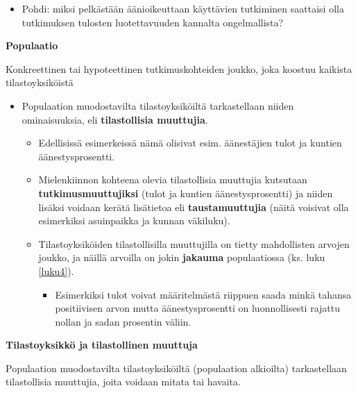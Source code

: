 \documentclass[
]{book}
\providecommand{\tightlist}{%
  \setlength{\itemsep}{0pt}\setlength{\parskip}{0pt}}
\begin{document}
\begin{itemize}
\tightlist
\item
  Pohdi: miksi pelkästään äänioikeuttaan käyttävien tutkiminen saattaisi olla tutkimuksen tulosten luotettavuuden kannalta ongelmallista?
\end{itemize}

\begin{defblock}{}
\textbf{Populaatio}

Konkreettinen tai hypoteettinen tutkimuskohteiden joukko, joka koostuu kaikista tilastoyksiköistä

\end{defblock}

\begin{itemize}
\tightlist
\item
  Populaation muodostavilta tilastoyksiköiltä tarkastellaan niiden ominaisuuksia, eli \textbf{tilastollisia muuttujia}.

  \begin{itemize}
  \tightlist
  \item
    Edellisissä esimerkeissä nämä olisivat esim. äänestäjien tulot ja kuntien äänestysprosentti.
  \item
    Mielenkiinnon kohteena olevia tilastollisia muuttujia kutsutaan \textbf{tutkimusmuuttujiksi} (tulot ja kuntien äänestysprosentti) ja niiden lisäksi voidaan kerätä lisätietoa eli \textbf{taustamuuttujia} (näitä voisivat olla esimerkiksi asuinpaikka ja kunnan väkiluku).
  \item
    Tilastoyksiköiden tilastollisilla muuttujilla on tietty mahdollisten arvojen joukko, ja näillä arvoilla on jokin \textbf{jakauma} populaatiossa (ks. luku \ref{luku4}).

    \begin{itemize}
    \tightlist
    \item
      Esimerkiksi tulot voivat määritelmästä riippuen saada minkä tahansa positiivisen arvon mutta äänestysprosentti on luonnollisesti rajattu nollan ja sadan prosentin väliin.
    \end{itemize}
  \end{itemize}
\end{itemize}

\begin{defblock}{}
\textbf{Tilastoyksikkö ja tilastollinen muuttuja}

Populaation muodostavilta tilastoyksiköiltä (populaation alkioilta) tarkastellaan tilastollisia muuttujia, joita voidaan mitata tai havaita.

\end{defblock}
\end{document}
